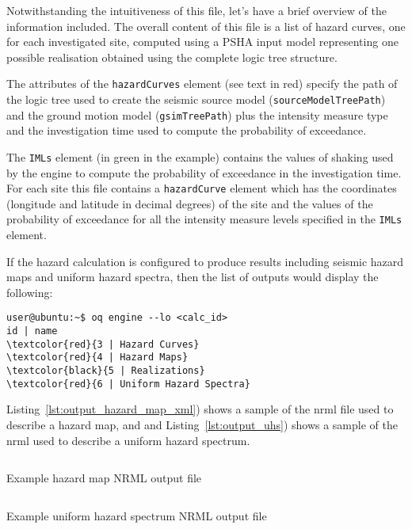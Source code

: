 Notwithstanding the intuitiveness of this file, let's have a brief overview of
the information included. The overall content of this file is a list of hazard
curves, one for each investigated site, computed using a PSHA input model
representing one possible realisation obtained using the complete logic tree
structure.

The attributes of the \texttt{hazardCurves} element (see text in red) specify
the path of the logic tree used to create the seismic source model
(\texttt{source\-Model\-TreePath}) and the ground motion model
(\texttt{gsim\-Tree\-Path}) plus the intensity measure type and the
investigation time used to compute the probability of exceedance.

The \texttt{IMLs} element (in green in the example) contains the values of
shaking used by the engine to compute the probability of exceedance in the
investigation time. For each site this file contains a \texttt{hazardCurve}
element which has the coordinates (longitude and latitude in decimal degrees)
of the site and the values of the probability of exceedance for all the
intensity measure levels specified in the \texttt{IMLs} element.

If the hazard calculation is configured to produce results including seismic
hazard maps and uniform hazard spectra, then the list of outputs would display
the following:

\begin{Verbatim}[frame=single, commandchars=\\\{\}, fontsize=\small]
user@ubuntu:~$ oq engine --lo <calc_id>
id | name
\textcolor{red}{3 | Hazard Curves}
\textcolor{red}{4 | Hazard Maps}
\textcolor{black}{5 | Realizations}
\textcolor{red}{6 | Uniform Hazard Spectra}
\end{Verbatim}

Listing~\ref{lst:output_hazard_map_xml}) shows a sample of the nrml file
used to describe a hazard map, and and Listing~\ref{lst:output_uhs})
shows a sample of the nrml used to describe a uniform hazard spectrum.

\begin{listing}[htbp]
  \inputminted[firstline=1,firstnumber=1,fontsize=\footnotesize,frame=single,linenos,bgcolor=lightgray]{xml}{oqum/hazard/verbatim/output_hazard_map.xml}
  \caption{Example hazard map NRML output file}
  \label{lst:output_hazard_map_xml}
\end{listing}


\begin{listing}[htbp]
  \inputminted[firstline=1,firstnumber=1,fontsize=\footnotesize,frame=single,linenos,bgcolor=lightgray]{xml}{oqum/hazard/verbatim/output_uhs.xml}
  \caption{Example uniform hazard spectrum NRML output file}
  \label{lst:output_uhs}
\end{listing}